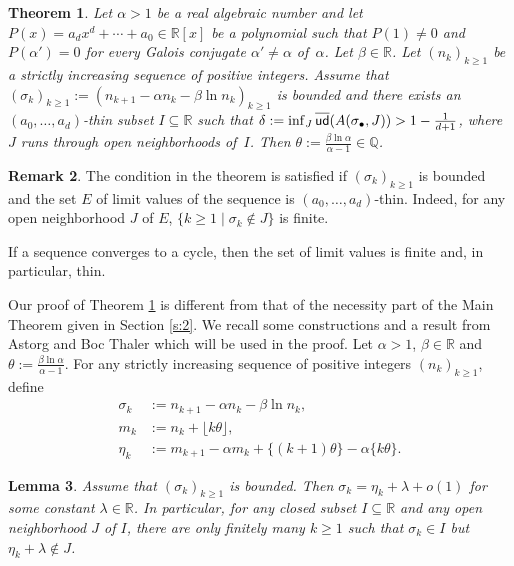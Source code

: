 \documentclass[12pt,centertags,oneside]{amsart}
\newtheorem{theorem}{Theorem}[section]
\newtheorem{lemma}[theorem]{Lemma}
\theoremstyle{definition}
\newtheorem{remark}[theorem]{Remark}
\newcommand{\Q}{\mathbb{Q}}
\newcommand{\R}{\mathbb{R}}
\newcommand{\uden}{\overline{\sf ud}}
\renewcommand{\ge}{\geqslant}
\begin{document}
\begin{theorem}\label{t:nec}
Let $\alpha>1$ be a real algebraic number and let $P(x)=a_d x^d+\dotsm 
+a_0\in \R[x]$ be a polynomial such that $P(1)\neq 0$ and $P(\alpha')=0$ 
for every Galois conjugate $\alpha'\neq \alpha$ of~$\alpha$. Let $\beta\in 
\R$. Let $(n_k)_{k\ge 1}$ be a strictly increasing sequence of positive 
integers. Assume that $(\sigma_k)_ {k\geqslant 1}:=(n_{k+1}-\alpha 
n_k-\beta \ln n_k)_{k\geqslant 1}$ is bounded and there exists an 
$(a_0,\dots,a_d)$-thin subset $I\subseteq \R$ such that $\delta:=\inf_J 
\uden(A(\sigma_\bullet,J))>1-\frac{1}{d+1}$, where $J$ runs through open 
neighborhoods of~$I$. Then $\theta:=\frac{\beta\ln\alpha}{\alpha-1}\in \Q$. 
\end{theorem}

\begin{remark}
The condition in the theorem is satisfied if $(\sigma_k)_{k\geqslant 1}$ is 
bounded and the set $E$ of limit values of the sequence is 
$(a_0,\dots,a_d)$-thin. Indeed, for any open neighborhood $J$ of $E$, $\{k\ge 
1\mid \sigma_k \not\in J\}$ is finite. 

If a sequence converges to a cycle, then the set of limit values is finite 
and, in particular, thin. 
\end{remark}

Our proof of Theorem \ref{t:nec} is different from that of the necessity 
part of the Main Theorem given in Section \ref{s:2}. We recall some 
constructions and a result from Astorg and Boc Thaler \cite[Section 
10]{Astorg-Boc Thaler-2024} which will be used in the proof. Let 
$\alpha>1$, $\beta\in\mathbb{R}$ and 
$\theta:=\frac{\beta\ln\alpha}{\alpha-1}$. For any strictly increasing 
sequence of positive integers $(n_k)_{k\geqslant 1}$, define 
\begin{align*}
\sigma_k&:=n_{k+1}-\alpha n_k-\beta\ln n_k,\\
m_k&:=n_k+\lfloor k\theta\rfloor,\\
\eta_k&:=m_{k+1}-\alpha m_k+\{(k+1)\theta\}-\alpha\{k\theta\}.
\end{align*}

\begin{lemma}\label{l:ABT}
Assume that $(\sigma_k)_{k\ge 1}$ is bounded. Then 
$\sigma_k=\eta_k+\lambda+o(1)$ for some constant $\lambda\in \R$. In 
particular, for any closed subset $I\subseteq \R$ and any open neighborhood 
$J$ of $I$, there are only finitely many $k\ge 1$ such that $\sigma_k\in I$ 
but $\eta_k+\lambda\not\in J$. 
\end{lemma}
\end{document}
